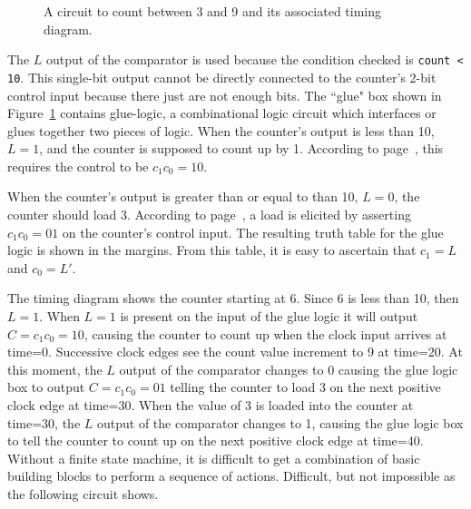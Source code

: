 \begin{figure}[ht]
\caption{A circuit to count between 3 and 9 and its associated timing diagram.}
\label{fig:sequentialBBcomb1}

\end{figure}

The $L$ output of the comparator is used because the condition checked is 
\verb+count < 10+.  This single-bit output cannot be directly connected to the
counter's 2-bit control input because there just are not enough bits.  The
``glue" box shown in Figure~\ref{fig:sequentialBBcomb1} contains glue-logic, a
combinational logic circuit which interfaces or glues together two pieces
of logic.  When the counter's output is less than 10, $L=1$, and the
counter is supposed to count up by 1.  According to 
page~\pageref{page:counter}, this requires the control to be $c_1c_0=10$.

When the counter's output is greater than or equal to than 10, $L=0$, 
the counter should load 3.  According to 
page~\pageref{page:counter}, a load is elicited by asserting 
$c_1c_0=01$ on the counter's control input.  The 
resulting truth table for the glue logic is shown in the margins.  
From this table, it is easy to ascertain that $c_1 = L$ and $c_0 = L'$.


The timing diagram shows the counter starting at 6.  Since 6 is less 
than 10, then $L=1$.  When $L=1$ is present on the input of the
glue logic it will output $C=c_1c_0=10$, causing the counter
to count up when the clock input arrives at time=0.  Successive clock edges
see the count value increment to 9 at time=20.  At this moment, the $L$ output
of the comparator changes to 0 causing the glue logic box to output 
$C=c_1c_0=01$ telling the counter to load 3 on the next positive clock edge 
at time=30.  When the value of 3 is loaded into the counter at time=30, the
$L$ output of the comparator changes to 1, causing the glue logic box to
tell the counter to count up on the next positive clock edge at time=40.
Without a finite state machine, it is difficult to get a combination of basic 
building blocks to perform a sequence of actions. Difficult, but not 
impossible as the following circuit shows.
 
